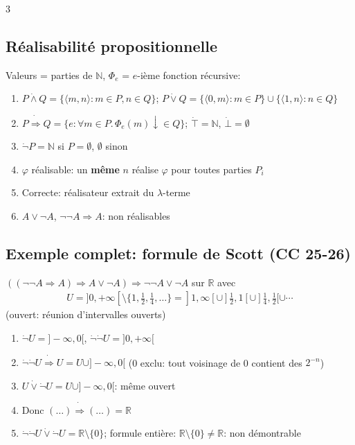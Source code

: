 \documentclass[12pt, a4paper]{article}
\newcommand{\cN}{\mathbb{N}}
\newcommand{\dv}{{\downarrow}}
\providecommand{\R}{\mathbb{R}}
\begin{document}
\begin{multicols*}{3}
	\subsection{Réalisabilité propositionnelle}
	Valeurs = parties de $\cN$, $\Phi_e$ = $e$-ième fonction récursive:
	\begin{enumerate}[\roman*.]
		\item $P\dot\wedge Q=\{\langle m,n\rangle:m\in P,n\in Q\}$; $P\dot\vee Q=\{\langle0,m\rangle:m\in P\}\cup\{\langle1,n\rangle:n\in Q\}$
		\item $P\dot\Rightarrow Q=\{e:\forall m\in P.\,\Phi_e(m)\dv\in Q\}$; $\dot\top=\cN$, $\dot\bot=\emptyset$
		\item $\dot\neg P=\cN$ si $P=\emptyset$, $\emptyset$ sinon
		\item $\varphi$ réalisable: un \textbf{même} $n$ réalise $\varphi$ pour toutes parties $P_i$
		\item Correcte: réalisateur extrait du $\lambda$-terme
		\item $A\vee\neg A$, $\neg\neg A\Rightarrow A$: non réalisables
	\end{enumerate}

	\colbreak
	\subsection{Exemple complet: formule de Scott (CC 25-26)}
	$((\neg\neg A\Rightarrow A)\Rightarrow A\vee\neg A)\Rightarrow\neg\neg A\vee\neg A$ sur $\R$ avec
	\begin{gather*}
		U=]0,+\infty[\setminus\{1,\tfrac12,\tfrac14,\dots\}=]1,\infty[\cup]\tfrac12,1[\cup]\tfrac14,\tfrac12[\cup\cdots
	\end{gather*}
	(ouvert: réunion d'intervalles ouverts)
	\begin{enumerate}[\roman*.]
		\item $\dot\neg U=]-\infty,0[$, $\dot\neg\dot\neg U=]0,+\infty[$
		\item $\dot\neg\dot\neg U\dot\Rightarrow U=U\cup]-\infty,0[$ (0 exclu: tout voisinage de 0 contient des $2^{-n}$)
		\item $U\dot\vee\dot\neg U=U\cup]-\infty,0[$: même ouvert
		\item Donc $(\dots)\dot\Rightarrow(\dots)=\R$
		\item $\dot\neg\dot\neg U\dot\vee\dot\neg U=\R\setminus\{0\}$; formule entière: $\R\setminus\{0\}\neq\R$: non démontrable
	\end{enumerate}


\end{multicols*}
\end{document}

